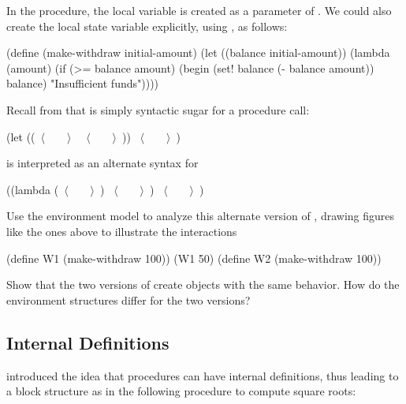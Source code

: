 \begin{exerciseGroup}
\label{Exercise 3.10}
 In the 
procedure, the local variable  is created as a parameter of
.  We could also create the local state variable
explicitly, using , as follows:

\begin{codeBlock}
(define (make-withdraw initial-amount)
  (let ((balance initial-amount))
    (lambda (amount)
      (if (>= balance amount)
          (begin (set! balance (- balance amount))
                 balance)
          "Insufficient funds"))))
\end{codeBlock}

Recall from  that  is simply syntactic sugar for a
procedure call:

\begin{codeBlock}
(let ((~\(\langle \)~~~~\(\rangle \)~ ~\(\langle \)~~~~\(\rangle \)~)) ~\(\langle \)~~~~\(\rangle \)~)
\end{codeBlock}

\noindent
is interpreted as an alternate syntax for

\begin{codeBlock}
((lambda (~\(\langle \)~~~~\(\rangle \)~) ~\(\langle \)~~~~\(\rangle \)~) ~\(\langle \)~~~~\(\rangle \)~)
\end{codeBlock}

Use the environment model to analyze this alternate version of
, drawing figures like the ones above to illustrate the
interactions

\begin{codeBlock}
(define W1 (make-withdraw 100))
(W1 50)
(define W2 (make-withdraw 100))
\end{codeBlock}

Show that the two versions of  create objects with the same
behavior.  How do the environment structures differ for the two versions?
\end{exerciseGroup}

\subsection{Internal Definitions}
\label{Section 3.2.4}

 introduced the idea that procedures can have internal
definitions, thus leading to a block structure as in the following procedure to
compute square roots:

